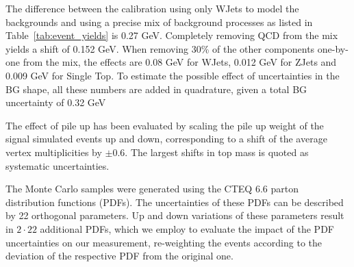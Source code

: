 \begin{description}[wide=\parindent]
The difference between the calibration using only WJets to model the backgrounds and using a precise mix of background
processes as listed in Table~\ref{tab:event_yields} is 0.27 GeV. Completely removing QCD from the mix yields a shift of
0.152 GeV. When removing 30\% of the other components one-by-one from the mix, the effects are 0.08 GeV for WJets, 0.012
GeV for ZJets and 0.009 GeV for Single Top. To estimate the possible effect of uncertainties in the BG shape, all these
numbers are added in quadrature, given a total BG uncertainty of 0.32 GeV



\item [Pileup.]

The effect of pile up has been evaluated by scaling the pile up weight of the signal simulated events up and down,
corresponding to a shift of the average vertex multiplicities by $\pm$0.6. The largest shifts in top mass is quoted as
systematic uncertainties.

\item [PDF.]
The Monte Carlo samples were generated using the CTEQ 6.6 parton distribution functions (PDFs).
The uncertainties of these PDFs can be described by 22 orthogonal parameters.
Up and down variations of these parameters result in $2 \cdot 22$ additional PDFs, which we employ
to evaluate the impact of the PDF uncertainties on our measurement, re-weighting the events according
to the deviation of the respective PDF from the original one.


\end{description}
